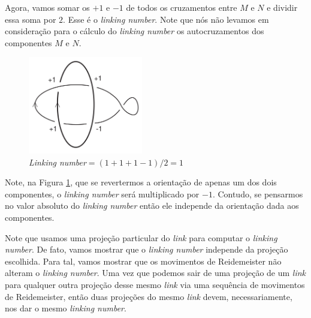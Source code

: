	\par\vspace{0.3cm} Agora, vamos somar os $+1$ e $-1$ de todos os cruzamentos entre $M$ e $N$ e dividir 
	essa soma por $2$. Esse é o \textit{linking number}. Note que nós não levamos em consideração para o 
	cálculo do \textit{linking number} os autocruzamentos dos componentes $M$ e $N$. 
	\begin{figure}[H]
		\begin{center}
			\includegraphics[width=5cm]{Images/exemplo_linking_number.png}
		\end{center}\caption{\textit{Linking number}$ = (1+1+1-1)/2 = 1$}\label{exemplo linking number}
	\end{figure}
	Note, na Figura \ref{exemplo linking number}, que se revertermos a orientação de 
	apenas um dos dois componentes, o \textit{linking number} será multiplicado por $-1$. Contudo, se 
	pensarmos no valor absoluto do \textit{linking number} então ele independe da orientação dada aos componentes.
	
	\par\vspace{0.3cm} Note que usamos uma projeção particular do \textit{link} para computar o 
	\textit{linking number}. De fato, vamos mostrar que o \textit{linking number} independe da projeção 
	escolhida. Para tal, vamos mostrar que os movimentos de Reidemeister não alteram o \textit{linking number}. 
	Uma vez que podemos sair de uma projeção de um \textit{link} para qualquer outra projeção desse mesmo
	\textit{link} via uma sequência de movimentos de Reidemeister, então duas projeções do mesmo 
	\textit{link} devem, necessariamente, nos dar o mesmo \textit{linking number}.
	
